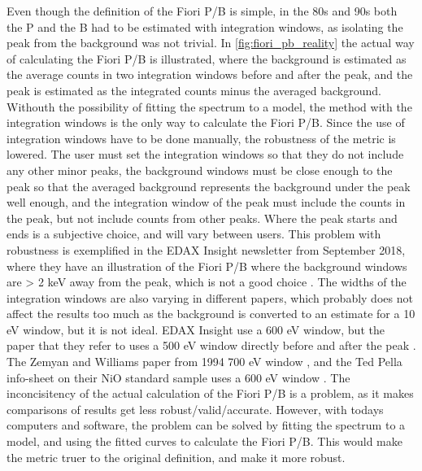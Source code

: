 Even though the definition of the Fiori P/B is simple, in the 80s and 90s both the P and the B had to be estimated with integration windows, as isolating the peak from the background was not trivial.
In \cref{fig:fiori_pb_reality} the actual way of calculating the Fiori P/B is illustrated, where the background is estimated as the average counts in two integration windows before and after the peak, and the peak is estimated as the integrated counts minus the averaged background.
Withouth the possibility of fitting the spectrum to a model, the method with the integration windows is the only way to calculate the Fiori P/B.
Since the use of integration windows have to be done manually, the robustness of the metric is lowered.
The user must set the integration windows so that they do not include any other minor peaks, the background windows must be close enough to the peak so that the averaged background represents the background under the peak well enough, and the integration window of the peak must include the counts in the peak, but not include counts from other peaks.
Where the peak starts and ends is a subjective choice, and will vary between users.
This problem with robustness is exemplified in the EDAX Insight newsletter from September 2018, where they have an illustration of the Fiori P/B where the background windows are > 2 keV away from the peak, which is not a good choice .
The widths of the integration windows are also varying in different papers, which probably does not affect the results too much as the background is converted to an estimate for a 10 eV window, but it is not ideal.
EDAX Insight use a 600 eV window, but the paper that they refer to uses a 500 eV window directly before and after the peak \cite{egerton_characterization_1994}.
The Zemyan and Williams paper from 1994 700 eV window \cite{zemyan_standard_performance_1994}, and the Ted Pella info-sheet on their NiO standard sample uses a 600 eV window \cite{ted_pella_nio_tem_2019}.
The inconcisitency of the actual calculation of the Fiori P/B is a problem, as it makes comparisons of results get less robust/valid/accurate.
However, with todays computers and software, the problem can be solved by fitting the spectrum to a model, and using the fitted curves to calculate the Fiori P/B.
This would make the metric truer to the original definition, and make it more robust.




